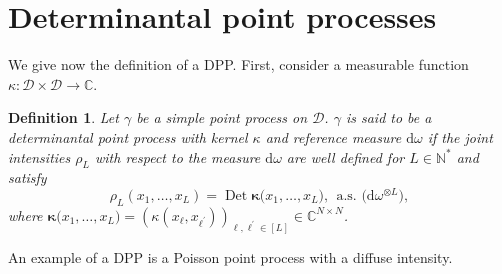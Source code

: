 \documentclass[twoside,11pt]{book}
\newtheorem{definition}{Definition}
\numberwithin{theorem}{chapter}
\numberwithin{definition}{chapter}
\numberwithin{proposition}{chapter}
\numberwithin{corollary}{chapter}
\numberwithin{example}{chapter}
\numberwithin{lemma}{chapter}
\numberwithin{assumption}{chapter}
\DeclareMathOperator{\Det}{Det}
\begin{document}








\section{Determinantal point processes}\label{sec:dpp_defs}

We give now the definition of a DPP. First, consider a measurable function $\kappa: \mathcal{D} \times \mathcal{D} \rightarrow \mathbb{C}$.
\begin{definition}\label{def:def_dpp_chapter_2}
Let $\gamma$ be a simple point process on $\mathcal{D}$. $\gamma$ is said to be a determinantal point process with kernel $\kappa$ and reference measure $\mathrm{d}\omega$ if the joint intensities $\rho_L$ with respect to the measure $\mathrm{d}\omega$ are well defined for $L \in \mathbb{N}^{*}$ and satisfy
\begin{equation}\label{eq:correlation_functions_dpp_def}
 \rho_{L}(x_{1}, \dots, x_{L}) = \Det \bm{\kappa}\big( x_{1}, \dots, x_{L} \big), \:\: \text{a.s. (} \mathrm{d}\omega^{\otimes L} \text{)},
\end{equation}
where $\bm{\kappa}\big( x_{1}, \dots, x_{L} \big) = (\kappa(x_{\ell},x_{\ell^{'}}))_{\ell,\ell^{'} \in [L]} \in \mathbb{C}^{N \times N}$.

\end{definition}
An example of a DPP is a Poisson point process with a diffuse intensity.
\end{document}
